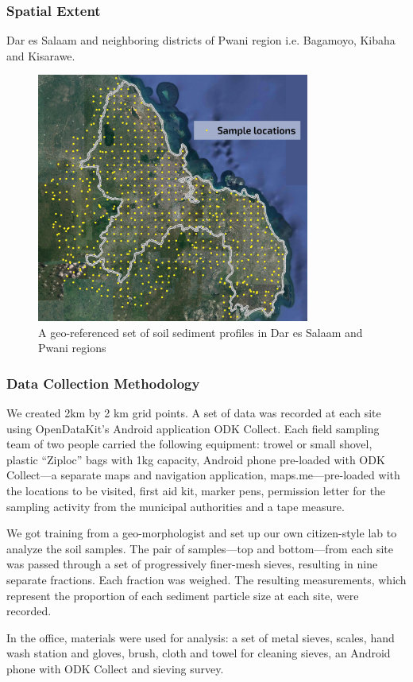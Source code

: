 \documentclass[a4paper,12pt,twoside]{article}
\begin{document}
\subsubsection{Spatial Extent}
Dar es Salaam and neighboring districts of Pwani region i.e. Bagamoyo, Kibaha and Kisarawe.

\begin{figure}[h]
  {\color{RHblue}\caption{A geo-referenced set of soil sediment profiles in Dar es Salaam and Pwani regions}}
  \centering
  \includegraphics[width=0.8\textwidth]{images/soil_sample_locations.jpg}
\end{figure}

\subsubsection{Data Collection Methodology}

\begin{multicols}{2}
We created 2km by 2 km grid points. A set of data was recorded at each site using OpenDataKit’s Android application ODK Collect. Each field sampling team of two people carried the following equipment: trowel or small shovel, plastic “Ziploc” bags with 1kg capacity, Android phone pre-loaded with ODK Collect---a separate maps and navigation application, maps.me---pre-loaded with the locations to be visited, first aid kit, marker pens, permission letter for the sampling activity from the municipal authorities and a tape measure. 

We got training from a geo-morphologist and set up our own citizen-style lab to analyze the soil samples. The pair of samples—top and bottom—from each site was passed through a set of progressively finer-mesh sieves, resulting in nine separate fractions. Each fraction was weighed. The resulting measurements, which represent the proportion of each sediment particle size at each site, were
recorded.

In the office, materials were used for analysis: a set of metal sieves, scales, hand wash station and gloves, brush, cloth and towel for cleaning sieves, an Android phone with ODK Collect and sieving survey.
\end{multicols}
\end{document}
